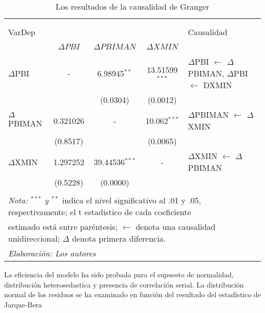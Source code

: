 \documentclass[11pt,]{article}
\begin{document}
\begin{table}[!htbp] \centering 
  \caption{Los resultados de la causalidad de Granger} 
  \label{tab:tb7} 
\small 
\begin{tabular}{@{\extracolsep{5pt}} lcccl} 
\\[-1.8ex]\hline 
\hline \\[-1.8ex] 
\\[-1.8ex] VarDep &   &  &  &Causalidad\\
\\[-1.8ex] & $\Delta PBI$  &  $\Delta PBIMAN$ & $\Delta XMIN$ &\\
\hline \\[-1.8ex] 
$\Delta$PBI & - & 6.98945$^{**}$ & 13.51599$^{***}$ & $\Delta$PBI $\leftarrow$ $\Delta$PBIMAN, $\Delta$PBI $\leftarrow$ DXMIN \\ 
 &  & (0.0304) & (0.0012) &  \\ 
$\Delta$PBIMAN & 0.321026 & - & 10.062$^{***}$ & $\Delta$PBIMAN $\leftarrow$ $\Delta$XMIN \\ 
 & (0.8517) &  & (0.0065) &  \\ 
$\Delta$XMIN & 1.297252 & 39.44536$^{***}$ & - & $\Delta$XMIN $\leftarrow$ $\Delta$PBIMAN \\ 
 & (0.5228) & (0.0000) &  &  \\ 
\hline \\[-1.8ex] 
\multicolumn{5}{l}{\footnotesize{\textit{Nota: $^{***}$ y $^{**}$} indica el nivel significativo al .01 y .05, respectivamente; el t estadistico de cada coeficiente}} \\ 
\multicolumn{5}{l}{\footnotesize{ estimado está entre paréntesis; $\leftarrow$ denota una causalidad unidireccional; $\Delta$ denota primera diferencia.}} \\ 
\multicolumn{5}{l}{\footnotesize{\textit{Elaboración: Los autores}}} \\ 
\end{tabular} 
\end{table}

La eficiencia del modelo ha sido probada para el supuesto de normalidad,
distribución heterosedastica y presencia de correlación serial. La
distribución normal de los residuos se ha examinado en función del
resultado del estadístico de Jarque-Bera
\end{document}
